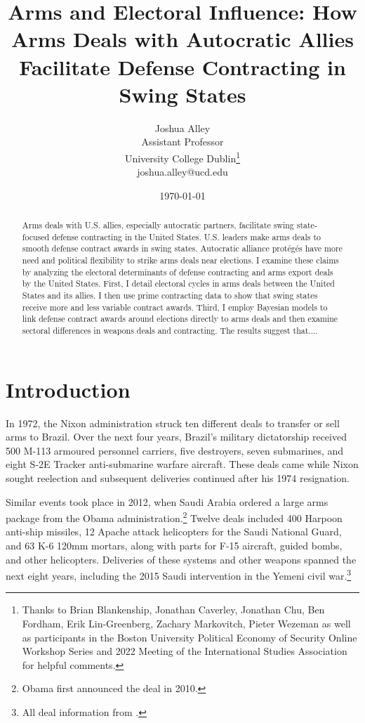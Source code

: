 \documentclass[12pt]{article}
\title{\textbf{Arms and Electoral Influence: How Arms Deals with Autocratic Allies Facilitate Defense Contracting in Swing States}}
\author{Joshua Alley \\
Assistant Professor \\
University College Dublin\thanks{Thanks to Brian Blankenship, Jonathan Caverley, Jonathan Chu, Ben Fordham, Erik Lin-Greenberg, Zachary Markovitch, Pieter Wezeman as well as participants in the Boston University Political Economy of Security Online Workshop Series and 2022 Meeting of the International Studies Association for helpful comments.} \\
joshua.alley@ucd.edu
}
\date{\today}
\begin{document}
\maketitle 

\begin{abstract} 
Arms deals with U.S. allies, especially autocratic partners, facilitate swing state-focused defense contracting in the United States. 
U.S. leaders make arms deals to smooth defense contract awards in swing states.
Autocratic alliance prot{\'e}g{\'e}s have more need and political flexibility to strike arms deals near elections. 
I examine these claims by analyzing the electoral determinants of defense contracting and arms export deals by the United States. 
First, I  detail electoral cycles in arms deals between the United States and its allies. 
I then use prime contracting data to show that swing states receive more and less variable contract awards. 
Third, I employ Bayesian models to link defense contract awards around elections directly to arms deals and then examine sectoral differences in weapons deals and contracting.
The results suggest that.... 
\end{abstract} 


\newpage 
\doublespace 


\section{Introduction}



In 1972, the Nixon administration struck ten different deals to transfer or sell arms to Brazil.
Over the next four years, Brazil's military dictatorship received 500 M-113 armoured personnel carriers, five destroyers, seven submarines, and eight S-2E Tracker anti-submarine warfare aircraft.
These deals came while Nixon sought reelection and subsequent deliveries continued after his 1974 resignation. 


Similar events took place in 2012, when Saudi Arabia ordered a large arms package from the Obama administration.\footnote{Obama first announced the deal in 2010.} 
Twelve deals included 400 Harpoon anti-ship missiles, 12 Apache attack helicopters for the Saudi National Guard, and 63 K-6 120mm mortars, along with parts for F-15 aircraft, guided bombs, and other helicopters. 
Deliveries of these systems and other weapons spanned the next eight years, including the 2015 Saudi intervention in the Yemeni civil war.\footnote{All deal information from \citep{Sipri2022}.}
\end{document}
